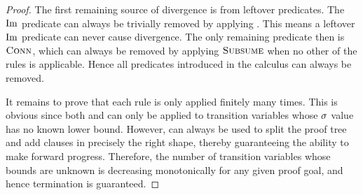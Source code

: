 \documentclass[acmsmall,review,anonymous,screen]{acmart}\settopmatter{printfolios=true,printccs=false,printacmref=true}
\theoremstyle{definition}
\begin{document}
\begin{proof}
The first remaining source of divergence is from leftover predicates. The
$\operatorname{Im}$ predicate can always be trivially removed by applying \Expand{}. This
means a leftover $\operatorname{Im}$ predicate can never cause divergence. The only
remaining predicate then is $\operatorname{\textsc{Conn}}$, which can always be removed by
applying $\textsc{Subsume}$ when no other of the rules is applicable. Hence all
predicates introduced in the calculus can always be removed.

It remains to prove that each rule is only applied finitely many times. This is
 obvious since both \Propagate{} and \Split{} can only be applied to transition
 variables whose $\operatorname{\sigma}$ value has no known lower bound. However, \Split{} can
 always be used to split the proof tree and add clauses in precisely the right
 shape, thereby guaranteeing the ability to make forward progress. Therefore,
 the number of transition variables whose bounds are unknown is decreasing
 monotonically for any given proof goal, and hence termination is guaranteed.
\end{proof}
\end{document}
